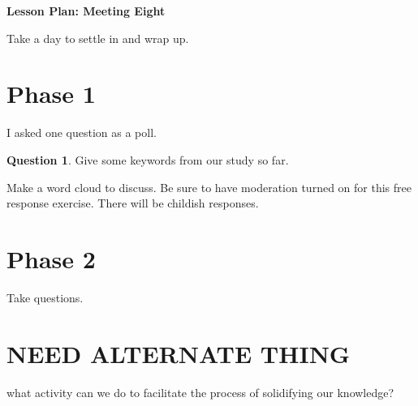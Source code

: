\documentclass[12pt]{amsart}
\theoremstyle{definition}
\newtheorem{question}{Question}
\begin{document}
\begin{center}
\textbf{\Huge
Lesson Plan: Meeting Eight
}
\end{center}
\vspace{.5in}

Take a day to settle in and wrap up.

\section*{Phase 1}
I asked one question as a poll.

\begin{question} 
Give some keywords from our study so far. 
\end{question}

Make a word cloud to discuss. 
Be sure to have moderation turned on for this free response exercise. 
There will be childish responses.

\section*{Phase 2}
Take questions.


\section*{NEED ALTERNATE THING}

what activity can we do to facilitate the process of solidifying our knowledge?
\end{document}
